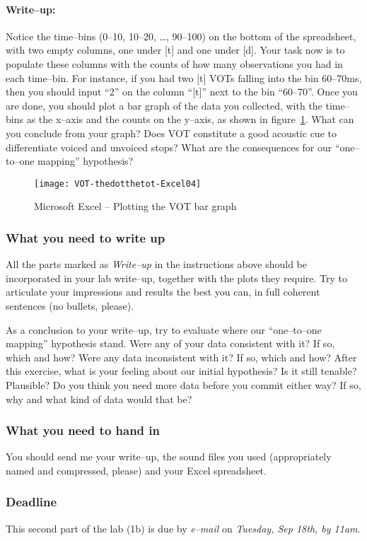 \documentclass{article}
\newcommand{\soft}[1]{\textsf{#1}}
\newcommand{\MSExcel}{\soft{Microsoft\texttrademark{} Excel}}
\begin{document}
\paragraph{Write--up:} Notice the time--bins (0--10, 10--20, \dots{}, 90--100) on the bottom of the spreadsheet, with two empty columns, one under [t] and one under [d]. Your task now is to populate these columns with the counts of how many observations you had in each time--bin. For instance, if you had two [t] VOTs falling into the bin 60--70ms, then you should input ``2'' on the column ``[t]'' next to the bin ``60--70''. Once you are done, you should plot a bar graph of the data you collected, with the time--bins as the x--axis and the counts on the y--axis, as shown in figure~\ref{step7VOT}. What can you conclude from your graph? Does VOT constitute a good acoustic cue to differentiate voiced and unvoiced stops? What are the consequences for our ``one--to--one mapping'' hypothesis?

\begin{figure}[!tbp]
\caption{\MSExcel{} -- Plotting the VOT bar graph}
\label{step7VOT}
	\begin{center}
		\texttt{[image: VOT-thedotthetot-Excel04]}
	\end{center}
\end{figure}
 
\subsubsection{What you need to write up}

All the parts marked as \emph{Write--up} in the instructions above should be incorporated in your lab write--up, together with the plots they require. Try to articulate your impressions and results the best you can, in full coherent sentences (no bullets, please).

As a conclusion to your write--up, try to evaluate where our ``one--to--one mapping'' hypothesis stand. Were any of your data consistent with it? If so, which and how? Were any data inconsistent with it? If so, which and how? After this exercise, what is your feeling about our initial hypothesis? Is it still tenable? Plausible? Do you think you need more data before you commit either way? If so, why and what kind of data would that be?

\subsubsection{What you need to hand in}

You should send me your write--up, the sound files you used (appropriately named and compressed, please) and your Excel spreadsheet.

\subsubsection{Deadline}

This second part of the lab (1b) is due by \emph{e--mail} on \emph{Tuesday, Sep 18th, by 11am}.
\end{document}
